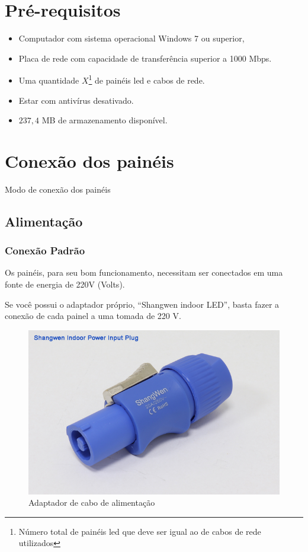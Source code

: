 \documentclass[12pt, a4paper]{article}
\begin{document}
\section{Pré-requisitos}\label{Pré-requisitos}
\begin{itemize}
	\item Computador com sistema operacional Windows 7 ou superior,	
	\item Placa de rede com capacidade de transferência superior a 1000 Mbps.
	\item Uma quantidade $X$\footnote{Número total de painéis led que deve ser igual ao de cabos de rede utilizados} de painéis led e cabos de rede.
	\item Estar com antivírus desativado.
	\item $237,4$ MB de armazenamento disponível.
\end{itemize}

\cleardoublepage
\section{Conexão dos painéis}\label{Conexão dos painéis}
Modo de conexão dos painéis

\subsection{Alimentação}\label{Alimentação}
\subsubsection{Conexão Padrão}\label{Conexão Padrão}
Os painéis, para seu bom funcionamento, necessitam ser conectados em uma fonte de energia de 220V (Volts).

Se você possui o adaptador próprio, ``Shangwen indoor LED'', basta fazer a conexão de cada painel a uma tomada de 220 V.
\begin{figure}[!htb]
	\centering
	\includegraphics[width=\textwidth]{caboAlimentacao.png}
	\caption{\label{fig:caboAlimentacao.png}Adaptador de cabo de alimentação}
\end{figure}
\end{document}
